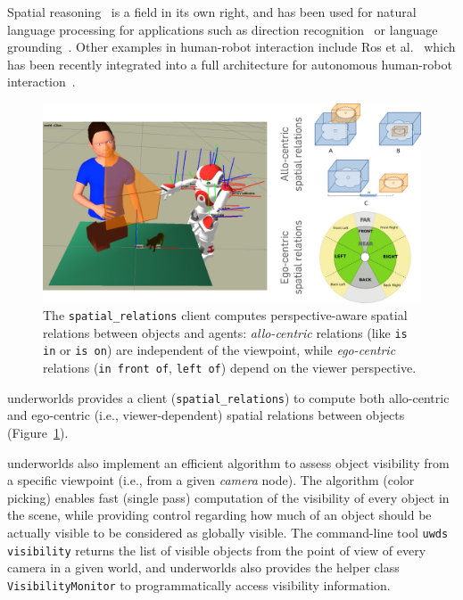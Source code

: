 \documentclass[letterpaper, 10 pt, conference]{ieeeconf}  %
\newcommand{\etal}{et al.\xspace}
\newcommand{\ie}{i.e.,\xspace}
\newcommand{\uwds}{{\sc underworlds}\xspace}
\begin{document}
Spatial reasoning~\cite{O'Keefe1999} is a field in its own right, and has been
used for natural language processing for applications such as direction
recognition~\cite{Kollar2010,Matuszek2010} or language
grounding~\cite{Tellex2010}. Other examples in human-robot interaction include Ros
\etal~\cite{ros2010solving, ros2010which} which has been recently integrated
into a full architecture for autonomous human-robot
interaction~\cite{lemaignan2016artificial}.

\begin{figure}
    \centering
    \includegraphics[width=\linewidth]{spatialrelations}
    \caption{The {\tt spatial\_relations} client computes perspective-aware
    spatial relations between objects and agents: \emph{allo-centric} relations (like
    {\tt is in} or {\tt is on}) are independent of the viewpoint, while
    \emph{ego-centric} relations ({\tt in front of}, {\tt left of}) depend on
    the viewer perspective.}
    \label{fig|spatialrelations}
\end{figure}

\uwds provides a client ({\tt spatial\_relations}) to compute both
allo-centric and ego-centric (\ie viewer-dependent) spatial relations
between objects (Figure~\ref{fig|spatialrelations}).


\uwds also implement an efficient algorithm to assess object visibility from a
specific viewpoint (\ie from a given \emph{camera} node). The algorithm (color
picking) enables fast (single pass) computation of the visibility of every
object in the scene, while providing control regarding how much of an object
should be actually visible to be considered as globally visible. The
command-line tool {\tt uwds visibility} returns the list of visible objects from
the point of view of every camera in a given world, and \uwds also provides the
helper class {\tt VisibilityMonitor} to programmatically access visibility
information.
\end{document}
